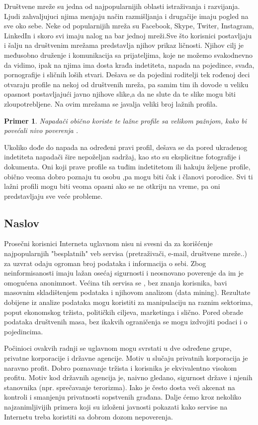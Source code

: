 \documentclass[a4paper]{article}
\newtheorem{primer}{Primer}[section]
\begin{document}
Društvene mreže su jedna od najpopularnijih oblasti istraživanja i razvijanja. Ljudi zahvaljujuci njima menjaju način razmišljanja i drugačije imaju pogled na sve oko sebe. Neke od popularnijih mreža su Facebook, Skype, Twiter, Instagram, LinkedIn i skoro svi imaju nalog na bar jednoj mreži.Sve što korisnici postavljaju i šalju na društvenim mrežama predstavlja njihov prikaz ličnosti. Njihov cilj je međusobno druženje i komunikacija sa prijateljima, koje ne možemo svakodnevno da vidimo, ipak na njima ima dosta krađa indetiteta, napada na pojedince, svađa, pornografije i sličnih loših stvari. Dešava se da pojedini roditelji tek rođenoj deci otvaraju profile na nekoj od društvenih mreža, pa samim tim ih dovode u veliku opasnost postavljajući javno njihove slike,a da ne slute da te slike mogu biti zloupotrebljene. Na ovim mrežama se javalja veliki broj lažnih profila.
\begin{primer}
Napadači obično koriste te lažne profile sa velikom pažnjom, kako bi povećali nivo poverenja \cite{fakePr} . 
\end{primer}
Ukoliko dođe do napada na određeni pravi profil, dešava se da pored ukradenog indetiteta  napadači šire nepoželjan sadržaj, kao sto su eksplicitne fotografije i dokumenta. Oni koji prave profile sa tuđim indetitetom ili hakuju željene profile, obično veoma dobro poznaju tu osobu ,pa  mogu biti čak i članovi porodice. Svi ti lažni profili mogu biti veoma opasni ako se ne otkriju na vreme, pa oni predstavljaju sve veće probleme.

\subsection{Naslov}
\label{subsec:podnaslovIP4}

\indent\indent Prosečni korisnici Interneta uglavnom nisu ni svesni da za korišćenje najpopularnjih "besplatnih" veb servisa (pretraživači, e-mail, društvene mreže..) za uzvrat odaju ogroman broj podataka i informacija o sebi. Zbog neinformisanosti imaju lažan osećaj sigurnosti i neosnovano poverenje da im je omogućena anonimnost. Većina tih servisa se , bez znanja korisnika,  bavi masovnim skladištenjem podataka i njihovom analizom (data mining\cite{?}). Rezultate dobijene iz analize podataka mogu koristiti za manipulaciju na raznim sektorima, poput ekonomskog tržista, političkih ciljeva, marketinga i slično. Pored obrade podataka društvenih masa, bez ikakvih ograničenja se mogu izdvojiti podaci i o pojedincima.
		
	Počinioci ovakvih radnji se uglavnom mogu svrstati u dve određene grupe, privatne korporacije i državne agencije. Motiv u slučaju privatnih korporacija je naravno profit. Dobro poznavanje tržista i korisnika je ekvivalentno visokom profitu. Motiv kod državnih agencija je, naivno gledano, sigurnost države i njenih stanovnika (npr. sprečavanje terorizma). Iako je često dosta veći akcenat na kontroli i smanjenju privatnosti sopstvenih građana. Dalje ćemo kroz nekoliko najzanimljivijih primera koji su izloženi javnosti pokazati kako servise na Internetu treba koristiti sa dobrom dozom nepoverenja.\\
	
\end{document}
